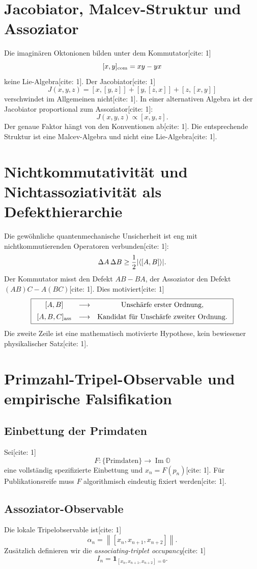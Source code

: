 \documentclass[11pt,a4paper]{article}
\newcommand{\OO}{\mathbb{O}}
\newcommand{\norm}[1]{\left\lVert #1 \right\rVert}
\DeclarePairedDelimiter{\abs}{\lvert}{\rvert}
\begin{document}
	\section{Jacobiator, Malcev-Struktur und Assoziator}
	Die imaginären Oktonionen bilden unter dem Kommutator[cite: 1]
	\[
	[x,y]_{\rm com}=xy-yx
	\]
	keine Lie-Algebra[cite: 1]. Der Jacobiator[cite: 1]
	\[
	J(x,y,z)=[x,[y,z]]+[y,[z,x]]+[z,[x,y]]
	\]
	verschwindet im Allgemeinen nicht[cite: 1]. In einer alternativen Algebra ist der Jacobiator proportional zum Assoziator[cite: 1]:
	\[
	\boxed{J(x,y,z)\propto[x,y,z].}
	\]
	Der genaue Faktor hängt von den Konventionen ab[cite: 1]. Die entsprechende Struktur ist eine Malcev-Algebra und nicht eine Lie-Algebra[cite: 1].
	
	\section{Nichtkommutativität und Nichtassoziativität als Defekthierarchie}
	Die gewöhnliche quantenmechanische Unsicherheit ist eng mit nichtkommutierenden Operatoren verbunden[cite: 1]:
	\[
	\Delta A\,\Delta B\ge\frac12\abs{\langle[A,B]\rangle}.
	\]
	Der Kommutator misst den Defekt $AB-BA$, der Assoziator den Defekt $(AB)C-A(BC)$[cite: 1]. Dies motiviert[cite: 1]
	\[
	\boxed{
		\begin{array}{ccc}
			[A,B]&\longrightarrow&\text{Unschärfe erster Ordnung},\\[0.5em]
			[A,B,C]_{\rm ass}&\longrightarrow&\text{Kandidat für Unschärfe zweiter Ordnung}.
	\end{array}}
	\]
	Die zweite Zeile ist eine mathematisch motivierte Hypothese, kein bewiesener physikalischer Satz[cite: 1].
	
	\section{Primzahl-Tripel-Observable und empirische Falsifikation}
	\subsection{Einbettung der Primdaten}
	Sei[cite: 1]
	\[
	F:\{\text{Primdaten}\}\to\operatorname{Im}\OO
	\]
	eine vollständig spezifizierte Einbettung und $x_n=F(p_n)$[cite: 1]. Für Publikationsreife muss $F$ algorithmisch eindeutig fixiert werden[cite: 1].
	
	\subsection{Assoziator-Observable}
	Die lokale Tripelobservable ist[cite: 1]
	\[
	\boxed{\alpha_n=\norm{[x_n,x_{n+1},x_{n+2}]}.}
	\]
	Zusätzlich definieren wir die \emph{associating-triplet occupancy}[cite: 1]
	\[
	I_n=\mathbf 1_{[x_n,x_{n+1},x_{n+2}]=0}.
	\]
	
\end{document}
